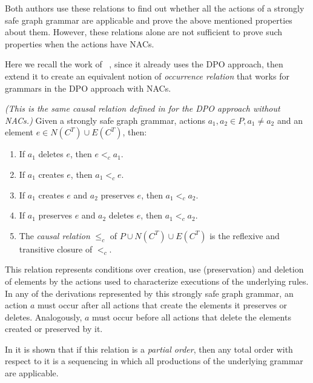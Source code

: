 Both authors use these relations to find out whether all the actions of a strongly safe graph grammar are applicable and prove the above mentioned properties about them. However, these relations alone are not sufficient to prove such properties when the actions have NACs.

Here we recall the work of ~\cite{Corradini1996}, since it already uses the DPO approach, then extend it to create an equivalent notion of \emph{occurrence relation} that works for grammars in the DPO approach with NACs.

\begin{definition}\label{def:causal-relation} \emph{(This is the same causal relation defined in \cite{Corradini1996} for the DPO approach without NACs.)} Given  \doublyTypedGraphGrammarCore{} a strongly safe graph grammar, actions \mbox{$a_1, a_2 \in P, a_1 \ne a_2$} and an element \mbox{$e \in N(C^T) \cup E(C^T)$}, then:

  \begin{enumerate}
    \item If $a_1$ deletes $e$, then $e <_c a_1$.
    \item If $a_1$ creates $e$, then $a_1 <_c e$.
    \item If $a_1$ creates $e$ and $a_2$ preserves $e$, then $a_1 <_c a_2$.
    \item If $a_1$ preserves $e$ and $a_2$ deletes $e$, then $a_1 <_c a_2$. 
    \item The \emph{causal relation} $\leq_c$ of $P \cup N(C^T) \cup E(C^T)$ is the reflexive and transitive closure of $<_c$.
  \end{enumerate}\end{definition}

This relation represents conditions over creation, use (preservation) and deletion of elements by the actions used to characterize executions of the underlying rules. In any of the derivations represented by this strongly safe graph grammar, an action $a$ must occur after all actions that create the elements it preserves or deletes. Analogously, $a$ must occur before all actions that delete the elements created or preserved by it.

In \cite{Corradini1996} it is shown that if this relation is a \emph{partial order}, then any total order with respect to it is a sequencing in which all productions of the underlying grammar are applicable.

